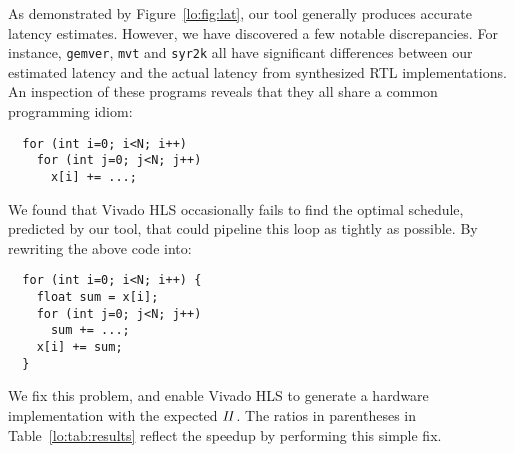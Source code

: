As demonstrated by Figure~\ref{lo:fig:lat}, our tool generally produces
accurate latency estimates. However, we have discovered a few notable
discrepancies. For instance, \verb|gemver|, \verb|mvt| and \verb|syr2k| all
have significant differences between our estimated latency and the actual
latency from synthesized RTL implementations.  An inspection of these programs
reveals that they all share a common programming idiom:
%
\begin{lstlisting}
  for (int i=0; i<N; i++)
    for (int j=0; j<N; j++)
      x[i] += ...;
\end{lstlisting}
%
We found that Vivado HLS occasionally fails to find the optimal schedule,
predicted by our tool, that could pipeline this loop as tightly as possible.
By rewriting the above code into:
%
\begin{lstlisting}
  for (int i=0; i<N; i++) {
    float sum = x[i];
    for (int j=0; j<N; j++)
      sum += ...;
    x[i] += sum;
  }
\end{lstlisting}
%
We fix this problem, and enable Vivado HLS to generate a hardware
implementation with the expected $\mathit{II}$. The ratios in parentheses in
Table~\ref{lo:tab:results} reflect the speedup by performing this simple fix.

